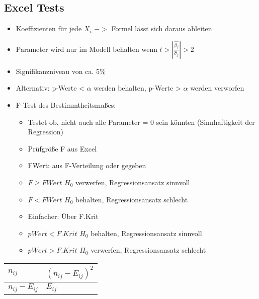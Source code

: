 \documentclass[a4paper]{article}
\begin{document}
\begin{landscape}
\begin{multicols}{4}
    \section*{Excel Tests}
    \begin{itemize}[noitemsep,nolistsep,leftmargin=*]
        \item Koeffizienten für jede $X_i$ $->$ Formel lässt sich daraus ableiten
        \item Parameter wird nur im Modell behalten wenn $t > |\frac{\hat{\beta_j}}{\hat{\sigma}_j}| > 2$
        \item Signifikanzniveau von ca. 5\%
        \item Alternativ: p-Werte < $\alpha$ werden behalten, p-Werte > $\alpha$ werden verworfen
        \item F-Test des Bestimmtheitsmaßes:
        \begin{itemize}[noitemsep,nolistsep,leftmargin=*]
            \item Testet ob, nicht auch alle Parameter = 0 sein könnten (Sinnhaftigkeit der Regression)
            \item Prüfgröße F aus Excel
            \item FWert: aus F-Verteilung oder gegeben
            \item $F  \geq FWert$ $H_0$ verwerfen, Regressionsansatz sinnvoll
            \item $F < FWert$ $H_0$ behalten, Regressionsansatz schlecht
            \item Einfacher: Über  F.Krit
            \item $p Wert < F.Krit$ $H_0$ behalten, Regressionsansatz sinnvoll
            \item $p Wert > F.Krit$ $H_0$ verwerfen, Regressionsansatz schlecht
        \end{itemize}
    \end{itemize}
    
    \end{multicols}

    \begin{table}[]
        \begin{tabular}{l|l}
        $n_{ij}$ & $(n_{ij}-E_{ij})^2$           \\ \hline
        $n_{ij}-E_{ij}$           & $E_{ij}$
        \end{tabular}
        \end{table}
\end{landscape}
\end{document}
